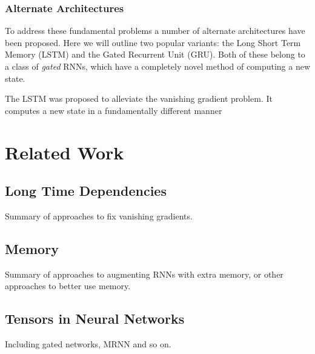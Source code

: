 \subsubsection{Alternate Architectures}
To address these fundamental problems a number of alternate architectures have been proposed.
Here we will outline two popular variants: the Long Short Term Memory (LSTM) and the Gated
Recurrent Unit (GRU). Both of these belong to a class of \emph{gated} RNNs, which have a
completely novel method of computing a new state.

The LSTM was proposed to alleviate the vanishing gradient problem. It computes a new state
in a fundamentally different manner

\section{Related Work}
\subsection{Long Time Dependencies}
Summary of approaches to fix vanishing gradients.
\subsection{Memory}
Summary of approaches to augmenting RNNs with extra memory, or other approaches to better
use memory.
\subsection{Tensors in Neural Networks}
Including gated networks, MRNN and so on.
